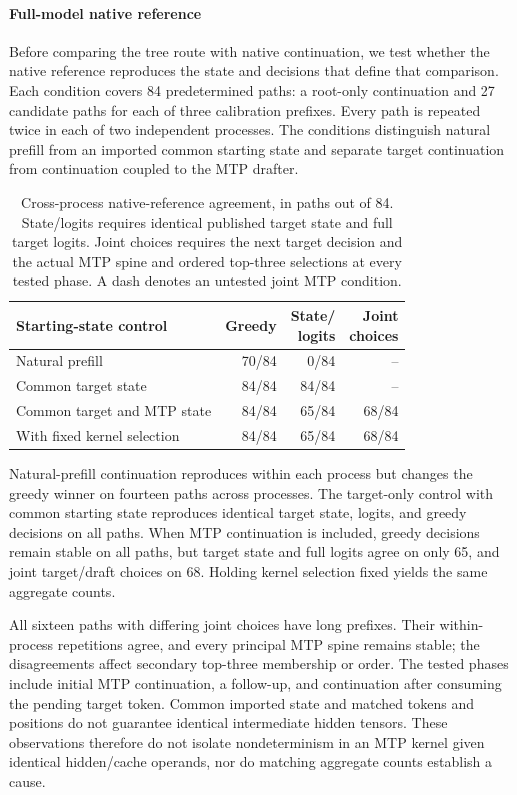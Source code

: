 \paragraph{Full-model native reference}
Before comparing the tree route with native continuation, we test whether the native reference reproduces the state and decisions that define that comparison. Each condition covers 84 predetermined paths: a root-only continuation and 27 candidate paths for each of three calibration prefixes. Every path is repeated twice in each of two independent processes. The conditions distinguish natural prefill from an imported common starting state and separate target continuation from continuation coupled to the MTP drafter.

\begin{table}[t]
\caption{Cross-process native-reference agreement, in paths out of 84. State/logits requires identical published target state and full target logits. Joint choices requires the next target decision and the actual MTP spine and ordered top-three selections at every tested phase. A dash denotes an untested joint MTP condition.}
\label{tab:native-continuation}
\centering\footnotesize
\setlength{\tabcolsep}{3pt}
\begin{tabularx}{\columnwidth}{@{}Xrrr@{}}
\toprule
Starting-state control & Greedy & \shortstack{State/\\logits} & \shortstack{Joint\\choices} \\
\midrule
Natural prefill & 70/84 & 0/84 & -- \\
Common target state & 84/84 & 84/84 & -- \\
Common target and MTP state & 84/84 & 65/84 & 68/84 \\
\quad With fixed kernel selection & 84/84 & 65/84 & 68/84 \\
\bottomrule
\end{tabularx}
\end{table}

Natural-prefill continuation reproduces within each process but changes the greedy winner on fourteen paths across processes. The target-only control with common starting state reproduces identical target state, logits, and greedy decisions on all paths. When MTP continuation is included, greedy decisions remain stable on all paths, but target state and full logits agree on only 65, and joint target/draft choices on 68. Holding kernel selection fixed yields the same aggregate counts.

All sixteen paths with differing joint choices have long prefixes. Their within-process repetitions agree, and every principal MTP spine remains stable; the disagreements affect secondary top-three membership or order. The tested phases include initial MTP continuation, a follow-up, and continuation after consuming the pending target token. Common imported state and matched tokens and positions do not guarantee identical intermediate hidden tensors. These observations therefore do not isolate nondeterminism in an MTP kernel given identical hidden/cache operands, nor do matching aggregate counts establish a cause.

